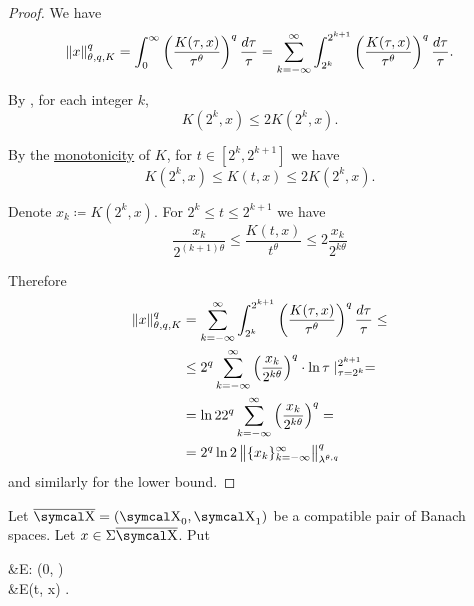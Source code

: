 \begin{proof}
  We have
  \begin{equation*}
    \left\Vert x \right\Vert_{\theta,q,K}^q
    =
    \int_0^\infty \left( \frac {K(\tau, x)} {\tau^\theta} \right)^q \frac {d\tau} \tau
    =
    \sum_{k=-\infty}^\infty \int_{2^k}^{2^{k+1}} \left( \frac {K(\tau, x)} {\tau^\theta} \right)^q \frac {d\tau} \tau.
  \end{equation*}

  By , for each integer \( k \),
  \begin{equation*}
    K(2^k, x) \leq 2 K(2^k, x).
  \end{equation*}

  By the \hyperref[def:k_functional_properties/basic]{monotonicity} of \( K \), for \( t \in [2^k, 2^{k+1}] \) we have
  \begin{equation*}
    K(2^k, x) \leq K(t, x) \leq 2 K(2^k, x).
  \end{equation*}

  Denote \( x_k \coloneqq K(2^k, x) \). For \( 2^k \leq t \leq 2^{k+1} \) we have
  \begin{equation*}
    \frac{x_k}{2^{(k+1)\theta}} \leq \frac{K(t, x)}{t^\theta} \leq 2 \frac{x_k}{2^{k\theta}}
  \end{equation*}

  Therefore
  \begin{align*}
    \left\Vert x \right\Vert_{\theta,q,K}^q
    &=
    \sum_{k=-\infty}^\infty \int_{2^k}^{2^{k+1}} \left( \frac {K(\tau, x)} {\tau^\theta} \right)^q \frac {d\tau} \tau
    \leq \\ &\leq
    2^q \sum_{k=-\infty}^\infty \left(\frac{x_k}{2^{k\theta}} \right)^q \cdot \ln \tau \mid_{\tau=2^k}^{2^{k+1}}
    = \\ &=
    \ln 2 2^q \sum_{k=-\infty}^\infty \left(\frac{x_k}{2^{k\theta}} \right)^q
    = \\ &=
    2^q \ln 2 \left\Vert \{ x_k \}_{k=-\infty}^\infty \right\Vert_{\lambda^{\theta,q}}^q
  \end{align*}
  and similarly for the lower bound.
\end{proof}

\begin{definition}\label{def:e_functional}
  Let \( \Ol{\CX} = (\CX_0, \CX_1) \) be a compatible pair of Banach spaces. Let \( x \in \Sigma \Ol{\CX} \). Put
  \begin{AlignedEquation}\label{eq:def:e_functional}
    &E: (0, \infty) \times {\Sigma \Ol{\CX}} \\
    &E(t, x) \coloneqq \inf {}.
  \end{AlignedEquation}
\end{definition}

